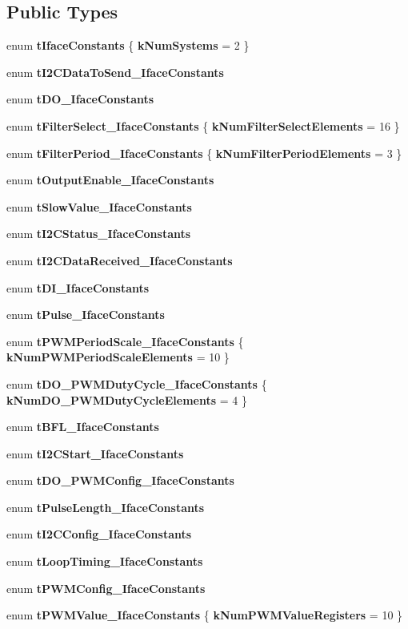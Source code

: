 \subsection*{Public Types}
\begin{DoxyCompactItemize}
\item 
enum {\bfseries tIfaceConstants} \{ {\bfseries kNumSystems} =  2
 \}
\item 
enum {\bfseries tI2CDataToSend\_\-IfaceConstants} 
\item 
enum {\bfseries tDO\_\-IfaceConstants} 
\item 
enum {\bfseries tFilterSelect\_\-IfaceConstants} \{ {\bfseries kNumFilterSelectElements} =  16
 \}
\item 
enum {\bfseries tFilterPeriod\_\-IfaceConstants} \{ {\bfseries kNumFilterPeriodElements} =  3
 \}
\item 
enum {\bfseries tOutputEnable\_\-IfaceConstants} 
\item 
enum {\bfseries tSlowValue\_\-IfaceConstants} 
\item 
enum {\bfseries tI2CStatus\_\-IfaceConstants} 
\item 
enum {\bfseries tI2CDataReceived\_\-IfaceConstants} 
\item 
enum {\bfseries tDI\_\-IfaceConstants} 
\item 
enum {\bfseries tPulse\_\-IfaceConstants} 
\item 
enum {\bfseries tPWMPeriodScale\_\-IfaceConstants} \{ {\bfseries kNumPWMPeriodScaleElements} =  10
 \}
\item 
enum {\bfseries tDO\_\-PWMDutyCycle\_\-IfaceConstants} \{ {\bfseries kNumDO\_\-PWMDutyCycleElements} =  4
 \}
\item 
enum {\bfseries tBFL\_\-IfaceConstants} 
\item 
enum {\bfseries tI2CStart\_\-IfaceConstants} 
\item 
enum {\bfseries tDO\_\-PWMConfig\_\-IfaceConstants} 
\item 
enum {\bfseries tPulseLength\_\-IfaceConstants} 
\item 
enum {\bfseries tI2CConfig\_\-IfaceConstants} 
\item 
enum {\bfseries tLoopTiming\_\-IfaceConstants} 
\item 
enum {\bfseries tPWMConfig\_\-IfaceConstants} 
\item 
enum {\bfseries tPWMValue\_\-IfaceConstants} \{ {\bfseries kNumPWMValueRegisters} =  10
 \}
\end{DoxyCompactItemize}
